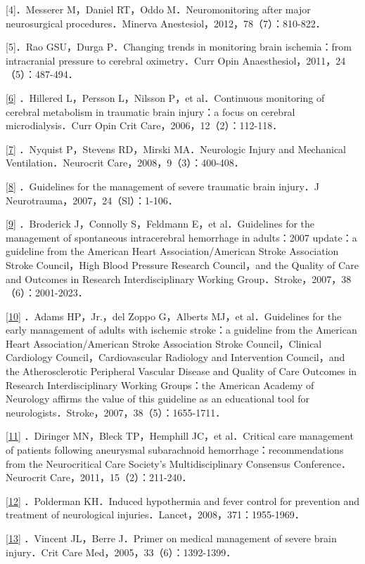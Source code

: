 {[}4{]}．Messerer M，Daniel RT，Oddo M．Neuromonitoring after major
neurosurgical procedures．Minerva Anestesiol，2012，78（7）：810-822．

{[}5{]}．Rao GSU，Durga P．Changing trends in monitoring brain
ischemia：from intracranial pressure to cerebral oximetry．Curr Opin
Anaesthesiol，2011，24（5）：487-494．

\protect\hyperlink{text00029.htmlux5cux23ch6-28-back}{{[}6{]}}
．Hillered L，Persson L，Nilsson P，et al．Continuous monitoring of
cerebral metabolism in traumatic brain injury：a focus on cerebral
microdialysis．Curr Opin Crit Care，2006，12（2）：112-118．

\protect\hyperlink{text00029.htmlux5cux23ch7-28-back}{{[}7{]}} ．Nyquist
P，Stevens RD，Mirski MA．Neurologic Injury and Mechanical
Ventilation．Neurocrit Care，2008，9（3）：400-408．

\protect\hyperlink{text00029.htmlux5cux23ch8-28-back}{{[}8{]}}
．Guidelines for the management of severe traumatic brain injury．J
Neurotrauma，2007，24（Sl）：1-106．

\protect\hyperlink{text00029.htmlux5cux23ch9-28-back}{{[}9{]}}
．Broderick J，Connolly S，Feldmann E，et al．Guidelines for the
management of spontaneous intracerebral hemorrhage in adults：2007
update：a guideline from the American Heart Association/American Stroke
Association Stroke Council，High Blood Pressure Research Council，and
the Quality of Care and Outcomes in Research Interdisciplinary Working
Group．Stroke，2007，38（6）：2001-2023．

\protect\hyperlink{text00029.htmlux5cux23ch10-28-back}{{[}10{]}} ．Adams
HP，Jr.，del Zoppo G，Alberts MJ，et al．Guidelines for the early
management of adults with ischemic stroke：a guideline from the American
Heart Association/American Stroke Association Stroke Council，Clinical
Cardiology Council，Cardiovascular Radiology and Intervention
Council，and the Atherosclerotic Peripheral Vascular Disease and Quality
of Care Outcomes in Research Interdisciplinary Working Groups：the
American Academy of Neurology affirms the value of this guideline as an
educational tool for neurologists．Stroke，2007，38（5）：1655-1711．

\protect\hyperlink{text00029.htmlux5cux23ch11-28-back}{{[}11{]}}
．Diringer MN，Bleck TP，Hemphill JC，et al．Critical care management of
patients following aneurysmal subarachnoid hemorrhage：recommendations
from the Neurocritical Care Society's Multidisciplinary Consensus
Conference．Neurocrit Care，2011，15（2）：211-240．

\protect\hyperlink{text00029.htmlux5cux23ch12-28-back}{{[}12{]}}
．Polderman KH．Induced hypothermia and fever control for prevention and
treatment of neurological injuries．Lancet，2008，371：1955-1969．

\protect\hyperlink{text00029.htmlux5cux23ch13-28-back}{{[}13{]}}
．Vincent JL，Berre J．Primer on medical management of severe brain
injury．Crit Care Med，2005，33（6）：1392-1399．

\protect\hypertarget{text00030.html}{}{}

